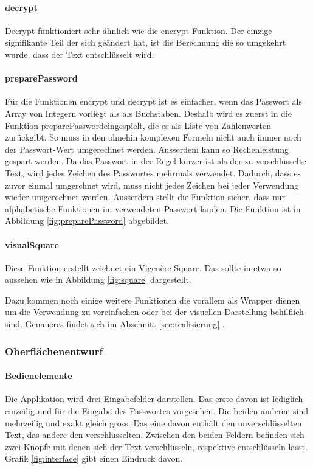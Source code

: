 \documentclass[11pt,paper=a4,final]{scrartcl}
\begin{document}
\paragraph{decrypt}
Decrypt funktioniert sehr \"ahnlich wie die encrypt Funktion. Der einzige
signifikante Teil der sich ge\"andert hat, ist die Berechnung die so umgekehrt
wurde, dass der Text entschl\"usselt wird.
\paragraph{preparePassword}
F\"ur die Funktionen encrypt und decrypt ist es einfacher, wenn das Passwort als
Array von Integern vorliegt als als Buchstaben. Deshalb wird es zuerst in die
Funktion \glqq preparePassword\grqq eingespielt, die es als Liste von
Zahlenwerten zur\"uckgibt. So muss in den ohnehin komplexen Formeln nicht auch
immer noch der Passwort-Wert umgerechnet werden. Ausserdem kann so
Rechenleistung gespart werden. Da das Passwort in der Regel k\"urzer ist als der
zu verschl\"usselte Text, wird jedes Zeichen des Passwortes mehrmals verwendet.
Dadurch, dass es zuvor einmal umgerchnet wird, muss nicht jedes Zeichen bei
jeder Verwendung wieder umgerechnet werden. Ausserdem stellt die Funktion
sicher, dass nur alphabetische Funktionen im verwendeten Passwort landen. Die
Funktion ist in Abbildung \ref{fig:preparePassword} \glqq
{}\grqq abgebildet.
\paragraph{visualSquare}
Diese Funktion erstellt zeichnet ein Vigen\`ere Square. Das sollte in etwa so
aussehen wie in Abbildung \ref{fig:square} \glqq {} \grqq
dargestellt.

Dazu kommen noch einige weitere Funktionen die vorallem als Wrapper dienen um
die Verwendung zu vereinfachen oder bei der visuellen Darstellung behilflich
sind. Genaueres findet sich im Abschnitt \ref{sec:realisierung}
.
\subsubsection{Oberfl\"achenentwurf}
\paragraph{Bedienelemente}
Die Applikation wird drei Eingabefelder darstellen. Das erste davon ist
lediglich einzeilig und f\"ur die Eingabe des Passwortes vorgesehen. Die beiden
anderen sind mehrzeilig und exakt gleich gross. Das eine davon enth\"alt den
unverschl\"usselten Text, das andere den verschl\"usselten. Zwischen den beiden
Feldern befinden sich zwei Kn\"opfe mit denen sich der Text verschl\"usseln,
respektive entschl\"usseln l\"asst. Grafik \ref{fig:interface} \glqq
{} \grqq gibt einen Eindruck davon.
\end{document}
